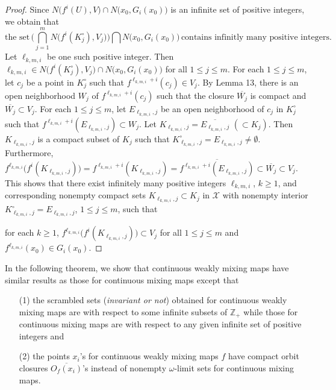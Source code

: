 \documentclass[12pt]{article}
\begin{document}
\begin{proof}
Since $N\big(f^i(U), V\big) \cap N\big(x_0, G_i(x_0)\big)$ is an infinite set of positive integers, we obtain that
$$
\text{the set} \, \bigg(\bigcap_{j=1}^m N\big(f^i(K_j^\circ), V_j\big)\bigg) \bigcap N\big(x_0, G_i(x_0)\big) \, \text{contains infinitly many positive integers}.
$$
\indent Let $\ell_{k,m,i}$ be one such positive integer.  Then $\ell_{k,m,i} \in N\big(f^i(K_j^\circ), V_j\big) \cap N\big(x_0, G_i(x_0)\big)$ for all $1 \le j \le m$.  For each $1 \le j \le m$, let $c_j$ be a point in $K_j^\circ$ such that $f^{\ell_{k,m,i}+i}(c_j) \in V_j$.  By Lemma 13, there is an open neighborhood $W_j$ of $f^{\ell_{k,m,i}+i}(c_j)$ such that the closure $\overline{W_j}$ is compact and $\overline{W_j} \subset V_j$.  For each $1 \le j \le m$, let $E_{\ell_{k,m,i},j}$ be an open neighborhood of $c_j$ in $K_j^\circ$ such that $f^{\ell_{k,m,i}+i}(E_{\ell_{k,m,i},j}) \subset W_j$.  Let $K_{\ell_{k,m,i}, j} = \overline{E_{\ell_{k,m,i},j}} \,\, (\subset K_j)$.  Then $K_{\ell_{k,m,i}, j}$ is a compact subset of $K_j$ such that $K_{\ell_{k,m,i},j}^\circ = E_{\ell_{k,m,i},j} \ne \emptyset$.  Furthermore, $f^{\ell_{k,m,i}}\big(f^i(K_{\ell_{k,m,i},j})\big) = f^{\ell_{k,m,i}+i}(K_{\ell_{k,m,i},j}) = \overline{f^{\ell_{k,m,i}+i}(E_{\ell_{k,m,i},j})} \subset \overline{W_j} \subset V_j$.  This shows that there exist infinitely many positive integers $\ell_{k,m,i}$, $k \ge 1$, and corresponding nonempty compact sets $K_{\ell_{k,m,i},j} \subset K_j$ in $\mathcal X$ with nonempty interior $K_{\ell_{k,m,i},j}^\circ = E_{\ell_{k,m,i},j}$, $1 \le j \le m$, such that 

\indent\indent\indent for each $k \ge 1$, $f^{\ell_{k,m,i}}\big(f^i(K_{\ell_{k,m,i},j})\big) \subset V_j$ for all $1 \le j \le m$ and $f^{\ell_{k,m,i}}(x_0) \in G_i(x_0)$.\qedhere
\end{proof}

\vspace{.1in}

In the following theorem, we show that continuous weakly mixing maps have similar results as those for continuous mixing maps except that 
\begin{itemize}
\item[(1)]
the scrambled sets ({\it invariant or not}) obtained for continuous weakly mixing maps are with respect to some infinite subsets of $\mathbb Z_+$ while those for continuous mixing maps are with respect to any given infinite set of positive integers and 

\item[(2)]
the points $x_i$'s for continuous weakly mixing maps $f$ have compact orbit closures $\overline{O_f(x_i)}$'s instead of nonempty $\omega$-limit sets for continuous mixing maps.  
\end{itemize}
\end{document}
